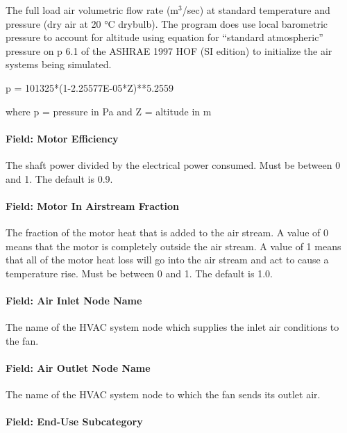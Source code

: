The full load air volumetric flow rate (m\(^{3}\)/sec) at standard temperature and pressure (dry air at 20 °C drybulb). The program does use local barometric pressure to account for altitude using equation for ``standard atmospheric'' pressure on p 6.1 of the ASHRAE 1997 HOF (SI edition) to initialize the air systems being simulated.

p = 101325*(1-2.25577E-05*Z)**5.2559

where p = pressure in Pa and Z = altitude in m

\paragraph{Field: Motor Efficiency}\label{field-motor-efficiency}

The shaft power divided by the electrical power consumed. Must be between 0 and 1. The default is 0.9.

\paragraph{Field: Motor In Airstream Fraction}\label{field-motor-in-airstream-fraction}

The fraction of the motor heat that is added to the air stream. A value of 0 means that the motor is completely outside the air stream. A value of 1 means that all of the motor heat loss will go into the air stream and act to cause a temperature rise. Must be between 0 and 1. The default is 1.0.

\paragraph{Field: Air Inlet Node Name}\label{field-air-inlet-node-name-002}

The name of the HVAC system node which supplies the inlet air conditions to the fan.

\paragraph{Field: Air Outlet Node Name}\label{field-air-outlet-node-name-002}

The name of the HVAC system node to which the fan sends its outlet air.

\paragraph{Field: End-Use Subcategory}\label{field-end-use-subcategory-001}

